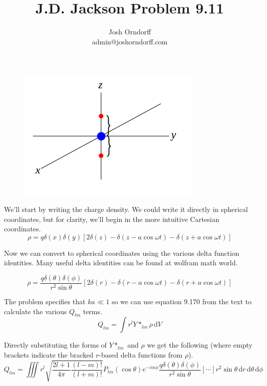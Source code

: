 \documentclass[10pt,a4paper]{article}
\begin{document}
\title{J.D. Jackson Problem 9.11}
\author{Josh Orndorff \\ admin@joshorndorff.com}
\maketitle

\begin{figure}
\includegraphics[scale=.5]{Jackson9-11.png}
\end{figure}
We'll start by writing the charge density.  We could write it directly in spherical coordinates, but for clarity, we'll begin in the more intuitive Cartesian coordinates.
\begin{equation}
\rho=q\delta(x)\delta(y)[2\delta(z)-\delta(z-a\cos\omega t)-\delta(z+a\cos\omega t)]
\end{equation}

Now we can convert to spherical coordinates using the various delta function identities. Many useful delta identities can be found at wolfram math world.

\begin{equation}
\rho=\frac{q\delta(\theta)\delta(\phi)}{r^2 \sin\theta}[2\delta(r)-\delta(r-a\cos\omega t)-\delta(r+a\cos\omega t)]
\end{equation}

The problem specifies that $ka\ll 1$ so we can use equation 9.170 from the text to calculate the various $Q_{lm}$ terms.
\begin{equation}
Q_{lm}=\int r^l Y*_{lm}\rho \,\mathrm{d}V
\end{equation}

Directly substituting the forms of $Y*_{lm}$ and $\rho$ we get the following (where empty brackets indicate the bracked $r$-based delta functions from $\rho$).
\begin{equation}
Q_{lm}=\iiint r^l\sqrt{\frac{2l+1}{4\pi}\frac{(l-m)!}{(l+m)!}}P_{lm}(\cos\theta)e^{-im\phi}\frac{q\delta(\theta)\delta(\phi)}{r^2\sin\theta}[\cdots]r^2\sin\theta\,\mathrm{d}r\,\mathrm{d}\theta\,\mathrm{d}\phi
\end{equation}
\end{document}
